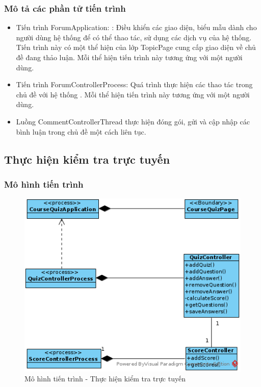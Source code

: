 \documentclass[./../main.tex]{subfiles}
\begin{document}
\subsubsection{Mô tả các phần tử tiến trình}
\begin{itemize}
	\item Tiến trình ForumApplication: : Điều khiển các giao diện, biểu mẫu dành cho người dùng hệ thống để có thể thao tác, sử dụng các dịch vụ của hệ thống. Tiến trình này có một thể hiện của lớp TopicPage cung cấp giao diện về chủ đề đang thảo luận.
	Mỗi thể hiện tiến trình này tương ứng với một người dùng.
	\item Tiến trình ForumControllerProcess: Quá trình thực hiện các thao tác trong chủ đề với hệ thống .
	Mỗi thể hiện tiến trình này tương ứng với một người dùng.
	\item Luồng CommentControllerThread thực hiện đóng gói, gửi và cập nhập các bình luận trong chủ đề một cách liên tục.
	
\end{itemize}

\subsection{Thực hiện kiểm tra trực tuyến}

\subsubsection{Mô hình tiến trình}

\begin{figure}[H]
	\centering
	\includegraphics[width=\linewidth]{./images/pv_take_test.png}
\caption{Mô hình tiến trình - Thực hiện kiểm tra trực tuyến}

\end{figure}
\end{document}
